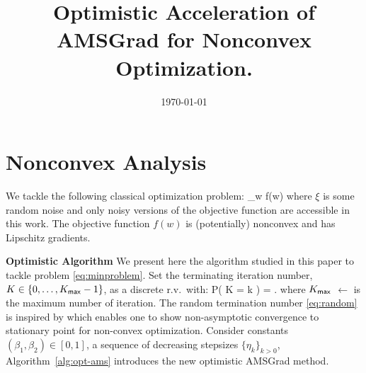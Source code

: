 \documentclass[11pt]{article}
\theoremstyle{k}
\begin{document}
\title{Optimistic Acceleration of AMSGrad for Nonconvex Optimization.}
\date{\today}

\maketitle


\section{Nonconvex Analysis}
We tackle the following classical optimization problem:
\beq\label{eq:minproblem}
\min \limits_{w \in \Theta} f(w) \eqdef \EE[ f(w, \xi)]
\eeq
where $\xi$ is some random noise and only noisy versions of the objective function are accessible in this work.
The objective function $f(w)$ is (potentially) nonconvex and has Lipschitz gradients.

\textbf{Optimistic Algorithm}
We present here the algorithm studied in this paper to tackle problem \eqref{eq:minproblem}.
Set the terminating iteration number, $K \in \{0,\dots,K_{\sf max}-1\}$, as a discrete r.v.~with:
\beq \label{eq:random}
   P( K = k ) = .
\eeq
where $K_{\sf max}$ $\leftarrow$ is the maximum number of iteration.
The random termination number \eqref{eq:random} is inspired by \citep{ghadimi2013stochastic} which enables one to show non-asymptotic convergence to stationary point for non-convex optimization. 
Consider constants $(\beta_1, \beta_2) \in [0,1]$, a sequence of decreasing stepsizes $\{\eta_k\}_{k>0}$, Algorithm~\ref{alg:opt-ams} introduces the new optimistic AMSGrad method.
\end{document}
